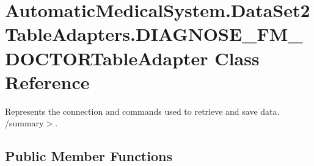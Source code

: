 \section{AutomaticMedicalSystem.DataSet2TableAdapters.DIAGNOSE\_\-FM\_\-DOCTORTableAdapter Class Reference}
\label{class_automatic_medical_system_1_1_data_set2_table_adapters_1_1_d_i_a_g_n_o_s_e___f_m___d_o_c_t_o_r_table_adapter}
Represents the connection and commands used to retrieve and save data. /summary$>$.  


\subsection*{Public Member Functions}
